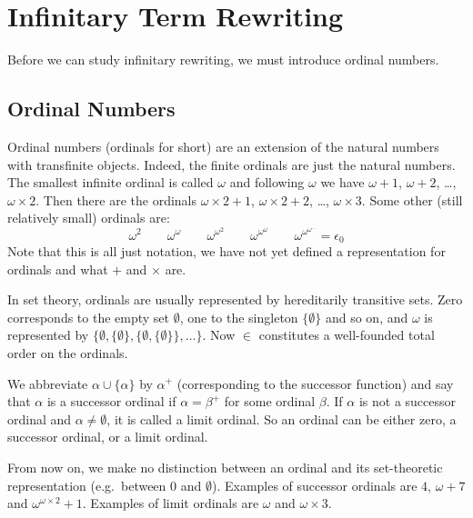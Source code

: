 \documentclass[11pt,oneside,a4paper,final]{report}
\theoremstyle{definition}
\begin{document}
\chapter{Infinitary Term Rewriting}\label{chap:itr}

Before we can study infinitary rewriting, we must introduce ordinal numbers.


\section{Ordinal Numbers}


Ordinal numbers (ordinals for short) are an extension of the natural numbers
with transfinite objects. Indeed, the finite ordinals are just the natural
numbers. The smallest infinite ordinal is called $\omega$ and following
$\omega$ we have $\omega + 1$, $\omega + 2$, \ldots, $\omega \times 2$. Then
there are the ordinals $\omega \times 2 + 1$, $\omega \times 2 + 2$, \ldots,
$\omega \times 3$. Some other (still relatively small) ordinals are:
\begin{displaymath}
  \omega^2 \qquad
  \omega^\omega \qquad
  \omega^{\omega^2} \qquad
  \omega^{\omega^\omega} \qquad
  \omega^{\omega^{\omega^{\ldots}}} = \epsilon_0 %
\end{displaymath}
Note that this is all just notation, we have not yet defined a representation
for ordinals and what $+$ and $\times$ are.

In set theory, ordinals are usually represented by hereditarily transitive
sets. Zero corresponds to the empty set $\emptyset$, one to the singleton $\{
\emptyset \}$ and so on, and $\omega$ is represented by $\{ \emptyset, \{
\emptyset \}, \{ \emptyset, \{ \emptyset \} \} , \ldots \}$. Now $\in$
constitutes a well-founded total order on the ordinals.

We abbreviate $\alpha \cup \{ \alpha \}$ by $\alpha^+$ (corresponding to the
successor function) and say that $\alpha$ is a successor ordinal if $\alpha =
\beta^+$ for some ordinal $\beta$. If $\alpha$ is not a successor ordinal and
$\alpha \neq \emptyset$, it is called a limit ordinal. So an ordinal can
be either zero, a successor ordinal, or a limit ordinal.

From now on, we make no distinction between an ordinal and its set-theoretic
representation (e.g.\ between $0$ and $\emptyset$). Examples of successor
ordinals are $4$, $\omega + 7$  and $\omega^{\omega \times 2} + 1$. Examples
of limit ordinals are $\omega$ and $\omega \times 3$.
\end{document}
